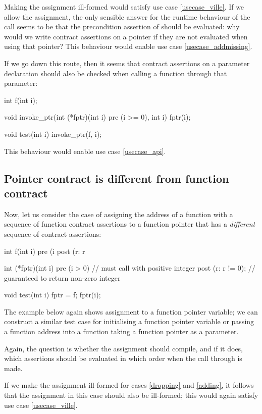 Making the assignment ill-formed would satisfy use case \ref{usecase_ville}. If we allow the assignment, the only sensible answer for the runtime behaviour of the call seems to be that the precondition assertion of  should be evaluated: why would we write contract assertions on a pointer if they are not evaluated when using that pointer? This behaviour would enable use case \ref{usecase_addmissing}.

If we go down this route, then it seems that contract assertions on a parameter declaration should also be checked when calling a function through that parameter:
\begin{codeblock}
int f(int i);

void invoke_ptr(int (*fptr)(int i) pre (i >= 0), int i) {
  fptr(i);
}

void test(int i) {
  invoke_ptr(f, i);
}
\end{codeblock}
This behaviour would enable use case \ref{usecase_api}.
\subsection{Pointer contract is different from function contract}

Now, let us consider the case of assigning the address of a function with a sequence of function contract assertions to a function pointer  that has a \emph{different} sequence of contract assertions:
\begin{codeblock}
int f(int i)
  pre (i %
  post (r: r %

int (*fptr)(int i)
  pre (i > 0)           // must call with positive integer
  post (r: r != 0);     // guaranteed to return non-zero integer

void test(int i) {
  fptr = f; 
  fptr(i);   
}
\end{codeblock}
The example below again shows assignment to a function pointer variable; we can construct a similar test case for initialising a function pointer variable or passing a function address into a function taking a function pointer as a parameter.

Again, the question is whether the assignment should compile, and if it does, which assertions should be evaluated in which order when the call through  is made.

If we make the assignment ill-formed for cases \ref{dropping} and \ref{adding}, it follows that the assignment in this case should also be ill-formed; this would again satisfy use case \ref{usecase_ville}.

